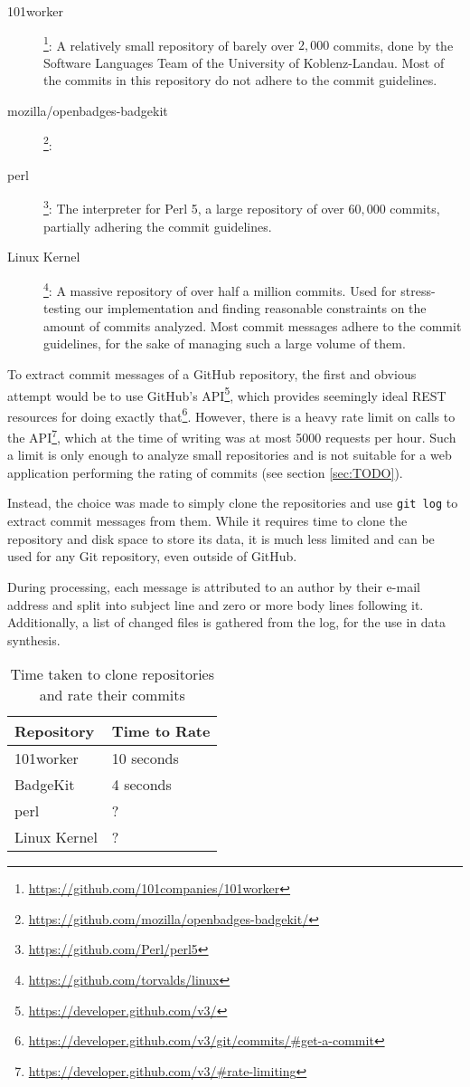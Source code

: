 \begin{description}
    \item[101worker]\footnote{\url{https://github.com/101companies/101worker}}: A relatively small repository of barely over $2,000$ commits, done by the Software Languages Team of the University of Koblenz-Landau. Most of the commits in this repository do not adhere to the commit guidelines.
    \item[mozilla/openbadges-badgekit]\footnote{\url{https://github.com/mozilla/openbadges-badgekit/}}: %
    \item[perl]\footnote{\url{https://github.com/Perl/perl5}}: The interpreter for Perl 5, a large repository of over $60,000$ commits, partially adhering the commit guidelines.
    \item[Linux Kernel]\footnote{\url{https://github.com/torvalds/linux}}: A massive repository of over half a million commits. Used for stress-testing our implementation and finding reasonable constraints on the amount of commits analyzed. Most commit messages adhere to the commit guidelines, for the sake of managing such a large volume of them.
\end{description}

To extract commit messages of a GitHub repository, the first and obvious attempt would be to use GitHub's API\footnote{\url{https://developer.github.com/v3/}}, which provides seemingly ideal REST resources for doing exactly that\footnote{\url{https://developer.github.com/v3/git/commits/\#get-a-commit}}. However, there is a heavy rate limit on calls to the API\footnote{\url{https://developer.github.com/v3/\#rate-limiting}}, which at the time of writing was at most 5000 requests per hour. Such a limit is only enough to analyze small repositories and is not suitable for a web application performing the rating of commits (see section \ref{sec:TODO}).

Instead, the choice was made to simply clone the repositories and use \texttt{git log} to extract commit messages from them. While it requires time to clone the repository and disk space to store its data, it is much less limited and can be used for any Git repository, even outside of GitHub.

During processing, each message is attributed to an author by their e-mail address and split into subject line and zero or more body lines following it. Additionally, a list of changed files is gathered from the log, for the use in data synthesis.

\begin{table}[t]
    \begin{tabularx}{\textwidth}{@{}|Y|Y|@{}}\hline
        \textbf{Repository} & \textbf{Time to Rate} \\\hline
        101worker & 10 seconds \\\hline
        BadgeKit & 4 seconds \\\hline
        perl & ? \\\hline
        Linux Kernel & ?\\\hline
    \end{tabularx}
    \caption{Time taken to clone repositories and rate their commits}
    \label{tab:time}
\end{table}

